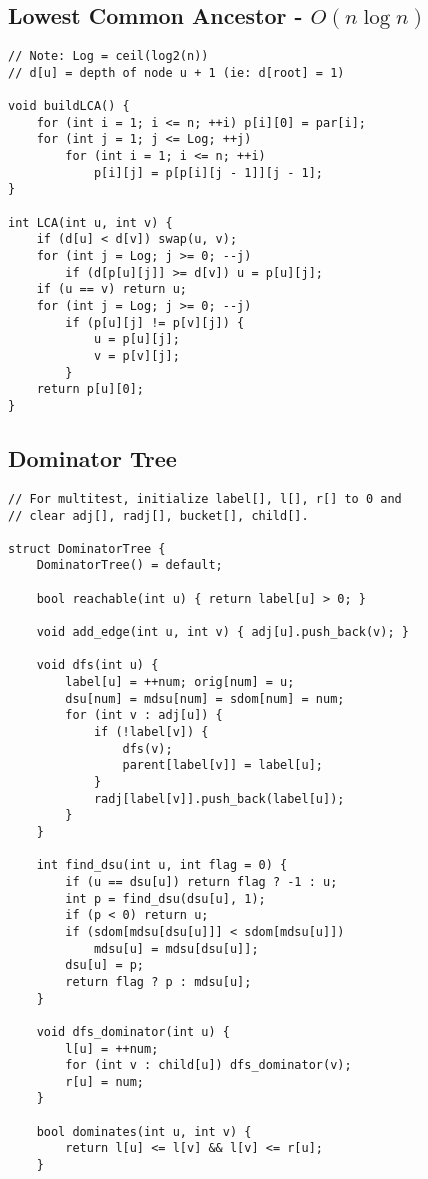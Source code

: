 \documentclass[10pt,landscape]{article}
\begin{document}
\begin{multicols}{2}
\subsection{Lowest Common Ancestor - $O(n\log n)$}
\begin{lstlisting}
// Note: Log = ceil(log2(n))
// d[u] = depth of node u + 1 (ie: d[root] = 1)

void buildLCA() {
    for (int i = 1; i <= n; ++i) p[i][0] = par[i];
    for (int j = 1; j <= Log; ++j)
        for (int i = 1; i <= n; ++i)
            p[i][j] = p[p[i][j - 1]][j - 1];
}

int LCA(int u, int v) {
    if (d[u] < d[v]) swap(u, v);
    for (int j = Log; j >= 0; --j)
        if (d[p[u][j]] >= d[v]) u = p[u][j];
    if (u == v) return u;
    for (int j = Log; j >= 0; --j)
        if (p[u][j] != p[v][j]) {
            u = p[u][j];
            v = p[v][j];
        }
    return p[u][0];
}
\end{lstlisting}
\subsection{Dominator Tree}
\begin{lstlisting}
// For multitest, initialize label[], l[], r[] to 0 and
// clear adj[], radj[], bucket[], child[].

struct DominatorTree {
    DominatorTree() = default;

    bool reachable(int u) { return label[u] > 0; }

    void add_edge(int u, int v) { adj[u].push_back(v); }

    void dfs(int u) {
        label[u] = ++num; orig[num] = u;
        dsu[num] = mdsu[num] = sdom[num] = num;
        for (int v : adj[u]) {
            if (!label[v]) {
                dfs(v);
                parent[label[v]] = label[u];
            }
            radj[label[v]].push_back(label[u]);
        }
    }
     
    int find_dsu(int u, int flag = 0) {
        if (u == dsu[u]) return flag ? -1 : u;
        int p = find_dsu(dsu[u], 1);
        if (p < 0) return u;
        if (sdom[mdsu[dsu[u]]] < sdom[mdsu[u]])
            mdsu[u] = mdsu[dsu[u]];
        dsu[u] = p;
        return flag ? p : mdsu[u];
    }

    void dfs_dominator(int u) {
        l[u] = ++num;
        for (int v : child[u]) dfs_dominator(v);
        r[u] = num;
    }

    bool dominates(int u, int v) {
        return l[u] <= l[v] && l[v] <= r[u];
    }
    

\end{lstlisting}
\end{multicols}
\end{document}
